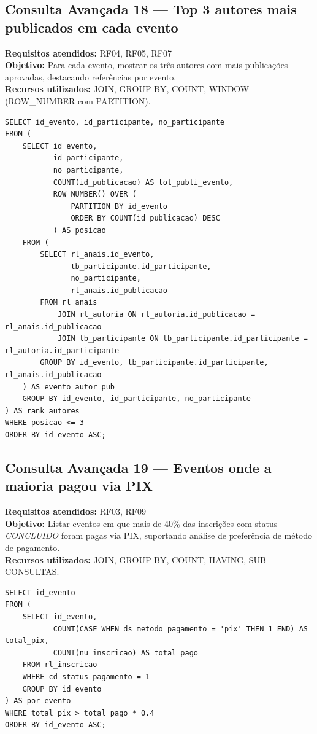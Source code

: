 \documentclass[12pt,a4paper]{article}
\begin{document}
\subsection{Consulta Avançada 18 --- Top 3 autores mais publicados em cada evento}
\textbf{Requisitos atendidos:} RF04, RF05, RF07 \\
\textbf{Objetivo:} Para cada evento, mostrar os três autores com mais publicações aprovadas, destacando referências por evento. \\
\textbf{Recursos utilizados:} JOIN, GROUP BY, COUNT, WINDOW (ROW\_NUMBER com PARTITION).
\begin{lstlisting}[caption={QA18 --- Top 3 autores mais publicados em cada evento.}]
SELECT id_evento, id_participante, no_participante
FROM (
    SELECT id_evento,
           id_participante,
           no_participante,
           COUNT(id_publicacao) AS tot_publi_evento,
           ROW_NUMBER() OVER (
               PARTITION BY id_evento
               ORDER BY COUNT(id_publicacao) DESC
           ) AS posicao
    FROM (
        SELECT rl_anais.id_evento,
               tb_participante.id_participante,
               no_participante,
               rl_anais.id_publicacao
        FROM rl_anais
            JOIN rl_autoria ON rl_autoria.id_publicacao = rl_anais.id_publicacao
            JOIN tb_participante ON tb_participante.id_participante = rl_autoria.id_participante
        GROUP BY id_evento, tb_participante.id_participante, rl_anais.id_publicacao
    ) AS evento_autor_pub
    GROUP BY id_evento, id_participante, no_participante
) AS rank_autores
WHERE posicao <= 3
ORDER BY id_evento ASC;
\end{lstlisting}

\subsection{Consulta Avançada 19 --- Eventos onde a maioria pagou via PIX}
\textbf{Requisitos atendidos:} RF03, RF09 \\
\textbf{Objetivo:} Listar eventos em que mais de 40\% das inscrições com status \textit{CONCLUIDO} foram pagas via PIX, suportando análise de preferência de método de pagamento. \\
\textbf{Recursos utilizados:} JOIN, GROUP BY, COUNT, HAVING, SUB-CONSULTAS.
\begin{lstlisting}[caption={QA19 --- Eventos onde mais de 40\% pagaram via PIX.}]
SELECT id_evento
FROM (
    SELECT id_evento,
           COUNT(CASE WHEN ds_metodo_pagamento = 'pix' THEN 1 END) AS total_pix,
           COUNT(nu_inscricao) AS total_pago
    FROM rl_inscricao
    WHERE cd_status_pagamento = 1
    GROUP BY id_evento
) AS por_evento
WHERE total_pix > total_pago * 0.4
ORDER BY id_evento ASC;
\end{lstlisting}
\end{document}
